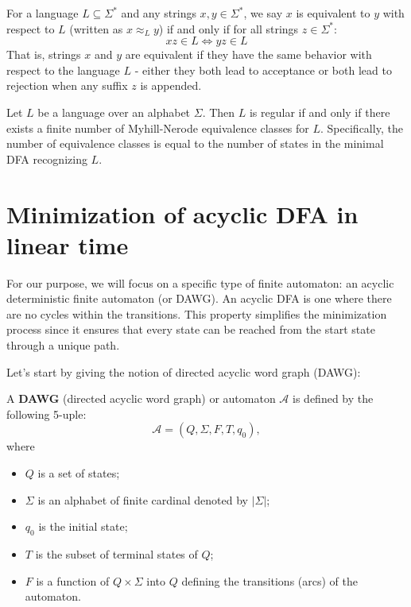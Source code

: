 \begin{definition}
    For a language $L \subseteq \Sigma^*$ and any strings $x,y \in \Sigma^*$, we say $x$ is equivalent to $y$ with respect to $L$ (written as $x \approx_L y$) if and only if for all strings $z \in \Sigma^*$:
    \[ xz \in L \Leftrightarrow yz \in L \]
    That is, strings $x$ and $y$ are equivalent if they have the same behavior with respect to the language $L$ - either they both lead to acceptance or both lead to rejection when any suffix $z$ is appended.
\end{definition}

\begin{theorem} \label{def:myhill-nerode}
    Let $L$ be a language over an alphabet $\Sigma$. Then $L$ is regular if and only if there exists a finite number of Myhill-Nerode equivalence classes for $L$. Specifically, the number of equivalence classes is equal to the number of states in the minimal DFA recognizing $L$.
\end{theorem}

\section{Minimization of acyclic DFA in linear time}
For our purpose, we will focus on a specific type of finite automaton: an acyclic deterministic finite automaton (or DAWG). An acyclic DFA is one where there are no cycles within the transitions. This property simplifies the minimization process since it ensures that every state can be reached from the start state through a unique path.

Let's start by giving the notion of directed acyclic word graph (DAWG):
\begin{definition}[DAWG]
    A \textbf{DAWG} (directed acyclic word graph) or automaton $\mathcal{A}$ is defined by the following 5-uple:
    \[
    \mathcal{A} = (Q, \Sigma, F, T, q_0),
    \]
    where
    \begin{itemize}
        \item $Q$ is a set of states;
        \item $\Sigma$ is an alphabet of finite cardinal denoted by $|\Sigma|$;
        \item $q_0$ is the initial state;
        \item $T$ is the subset of terminal states of $Q$;
        \item $F$ is a function of $Q \times \Sigma$ into $Q$ defining the transitions (arcs) of the automaton.
    \end{itemize}
\end{definition}

